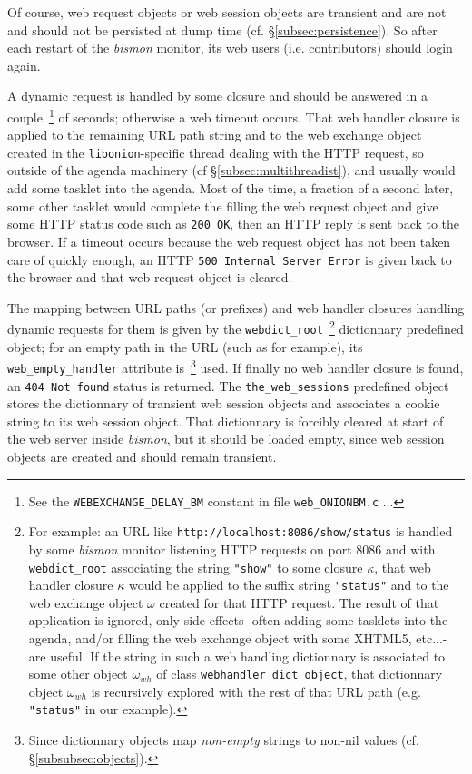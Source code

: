 Of course, web request objects or web session objects are
 transient and are not and should not be persisted at
dump  time (cf. §\ref{subsec:persistence}). So after each
restart of the \emph{bismon} monitor, its web users
(i.e. contributors) should login  again.

A dynamic request is handled by some closure  and
should be answered in a couple~\footnote{See the
  \texttt{WEBEXCHANGE\_DELAY\_BM} constant in file
  \texttt{web\_ONIONBM.c} ...} of seconds; otherwise a  web timeout  occurs. That web handler
 closure is applied to the remaining URL path
string and to the web exchange object created in the
\texttt{libonion}-specific thread dealing with the HTTP request, so
outside of the agenda machinery (cf §\ref{subsec:multithreadist}), and
usually would add some  tasklet into the 
agenda. Most of the time, a fraction of a second later, some other
tasklet would complete the filling the web request object and give
some HTTP status code such as \texttt{200 OK}, then an HTTP reply is
sent back to the browser. If a timeout occurs because the web request
object has not been taken care of quickly enough, an HTTP \texttt{500
  Internal Server Error} is given back to the browser and that web
request object is cleared.

The mapping between URL paths (or prefixes) and web handler closures
handling dynamic requests for them is given by the
\texttt{webdict\_root}~\footnote{For example: an URL like
  \texttt{http://localhost:8086/show/status} is handled by some
  \emph{bismon} monitor listening HTTP requests on port 8086 and with
  \texttt{webdict\_root} associating the string \texttt{"show"} to
  some closure $\kappa$, that web handler closure $\kappa$ would be
  applied to the suffix string \texttt{"status"} and to the web
  exchange object $\omega$ created for that HTTP request. The result
  of that application is ignored, only side effects -often adding some
  tasklets into the agenda, and/or filling the web exchange object
  with some XHTML5, etc...- are useful. If the string in such a web
  handling dictionnary is associated to some other object
  $\omega_{wh}$ of class \texttt{webhandler\_dict\_object}, that
  dictionnary object $\omega_{wh}$ is recursively explored with the
  rest of that URL path (e.g. \texttt{"status"} in our example).}
dictionnary predefined object; for an empty path in the URL (such as
{} for example), its
\texttt{web\_empty\_handler} attribute is~\footnote{Since dictionnary
  objects map \emph{non-empty} strings to non-nil values
  (cf. §\ref{subsubsec:objects}).} used.  If finally no web handler
closure is found, an \texttt{404 Not found} status is returned. The
\texttt{the\_web\_sessions} predefined object stores the dictionnary
of transient web session objects and associates a cookie string to its
web session object. That dictionnary is forcibly cleared at start of
the web server inside \emph{bismon}, but it should be loaded empty,
since web session objects are created and should remain transient.

